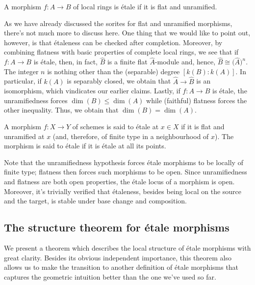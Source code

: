 \begin{definition}
\label{definition-etale-ring}
A morphism $f:A \to B$ of local rings is \'etale if it is flat and unramified.
\end{definition}

\noindent
As we have already discussed the sorites for flat and unramified morphisms,
there's not much more to discuss here. One thing that we would like to point
out, however, is that \'etaleness can be checked after completion. Moreover,
by combining flatness with basic properties of complete local rings, we see
that if $f:A \to B$ is \'etale, then, in fact, $\widehat{B}$ is a finite flat
$\widehat{A}$-module and, hence, $\widehat{B} \cong \big(\widehat{A}\big)^n$.
The integer $n$ is nothing other than the (separable) degree $[k(B):k(A)]$.
In particular, if $k(A)$ is separably closed, we obtain that
$\widehat{A} \to \widehat{B}$ is an isomorphism, which vindicates our earlier
claims. Lastly, if $f:A \to B$ is \'etale, the unramifiedness forces
$\dim(B) \leq  \dim(A)$ while (faithful) flatness forces the other
inequality. Thus, we obtain that $\dim(B) = \dim(A)$.

\begin{definition}
\label{definition-etale-schemes-1}
A morphism $f:X \to Y$ of schemes is said to \'etale at $x \in X$ if it is
flat and unramified at $x$ (and, therefore, of finite type in a neighbourhood
of $x$). The morphism is said to \'etale if it is \'etale at all its points.
\end{definition}

\noindent
Note that the unramifiedness hypothesis forces \'etale morphisms to be
locally of finite type; flatness then forces such morphisms to be open.
Since unramifiedness and flatness are both open properties, the \'etale
locus of a morphism is open. Moreover, it's trivially verified that
\'etaleness, besides being local on the source and the target, is stable
under base change and composition. 

\subsection{The structure theorem for \'etale morphisms}
\label{subsection-structure-etale-map}

\noindent
We present a theorem which describes the local structure of \'etale morphisms
with great clarity. Besides its obvious independent importance, this theorem
also allows us to make the transition to another definition of \'etale
morphisms that captures the geometric intuition better than the one we've
used so far. 

